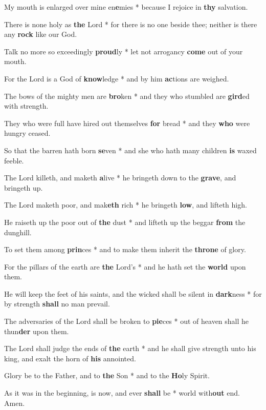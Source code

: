 \begin{multicols}{2}
	My mouth is enlarged over mine en\textbf{e}mies * because I rejoice in \textbf{thy} salvation.
	
	There is none holy as \textbf{the} Lord * for there is no one beside thee; neither is there any \textbf{rock} like our God.
	
	Talk no more so exceedingly \textbf{proud}ly * let not arrogancy \textbf{come} out of your mouth.
	
	For the Lord is a God of \textbf{know}ledge * and by him \textbf{ac}tions are weighed.
	
	The bows of the mighty men are \textbf{bro}ken * and they who stumbled are \textbf{gird}ed with strength.
	
	They who were full have hired out themselves \textbf{for} bread * and they \textbf{who} were hungry ceased.
	
	So that the barren hath born \textbf{se}ven * and she who hath many children \textbf{is} waxed feeble.
	
	The Lord killeth, and maketh \textbf{a}live * he bringeth down to the \textbf{grave}, and bringeth up.
	
	The Lord maketh poor, and mak\textbf{eth} rich * he bringeth \textbf{low}, and lifteth high.
	
	He raiseth up the poor out of \textbf{the} dust * and lifteth up the beggar \textbf{from} the dunghill.
	
	To set them among \textbf{prin}ces * and to make them inherit the \textbf{throne} of glory.
	
	For the pillars of the earth are \textbf{the} Lord's * and he hath set the \textbf{world} upon them.
	
	He will keep the feet of his saints, and the wicked shall be silent in \textbf{dark}ness * for by strength \textbf{shall} no man prevail.
	
	The adversaries of the Lord shall be broken to \textbf{pie}ces * out of heaven shall he thun\textbf{der} upon them.
	
	The Lord shall judge the ends of \textbf{the} earth * and he shall give strength unto his king, and exalt the horn of \textbf{his} annointed.
	
	Glory be to the Father, and to \textbf{the} Son * and to the \textbf{Ho}ly Spirit.
	
	As it was in the beginning, is now, and ever \textbf{shall} be * world with\textbf{out} end. Amen.
\end{multicols}